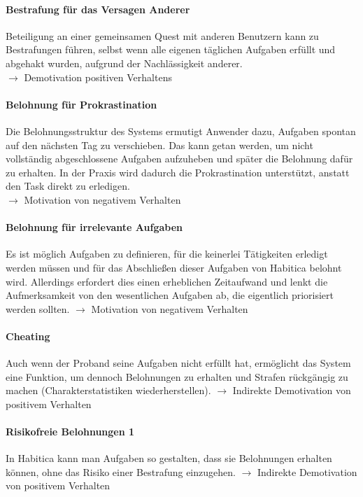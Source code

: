\documentclass[sigconf, nonacm]{acmart}
\begin{document}
\paragraph{Bestrafung für das Versagen Anderer}\label{sec:cpe2}
Beteiligung an einer gemeinsamen Quest mit anderen Benutzern kann zu Bestrafungen führen, selbst wenn alle eigenen täglichen Aufgaben erfüllt und abgehakt wurden, aufgrund der Nachlässigkeit anderer.\\
$\rightarrow$ Demotivation positiven Verhaltens

\paragraph{Belohnung für Prokrastination}\label{sec:cpe3}
Die Belohnungsstruktur des Systems ermutigt Anwender dazu, Aufgaben spontan auf den nächsten Tag zu verschieben. Das kann getan werden, um nicht vollständig abgeschlossene Aufgaben aufzuheben und später die Belohnung dafür zu erhalten. In der Praxis wird dadurch die Prokrastination unterstützt, anstatt den Task direkt zu erledigen.\\
$\rightarrow$ Motivation von negativem Verhalten

\paragraph{Belohnung für irrelevante Aufgaben}\label{sec:cpe4}
Es ist möglich Aufgaben zu definieren, für die keinerlei Tätigkeiten erledigt werden müssen und für das Abschließen dieser Aufgaben von Habitica belohnt wird. Allerdings erfordert dies einen erheblichen Zeitaufwand und lenkt die Aufmerksamkeit von den wesentlichen Aufgaben ab, die eigentlich priorisiert werden sollten.
$\rightarrow$ Motivation von negativem Verhalten

\paragraph{Cheating}\label{sec:cpe5}
Auch wenn der Proband seine Aufgaben nicht erfüllt hat, ermöglicht das System eine Funktion, um dennoch Belohnungen zu erhalten und Strafen rückgängig zu machen (Charakterstatistiken wiederherstellen).
$\rightarrow$ Indirekte Demotivation von positivem Verhalten

\paragraph{Risikofreie Belohnungen 1}\label{sec:cpe6}
In Habitica kann man Aufgaben so gestalten, dass sie Belohnungen erhalten können, ohne das Risiko einer Bestrafung einzugehen.
$\rightarrow$ Indirekte Demotivation von positivem Verhalten
\end{document}

